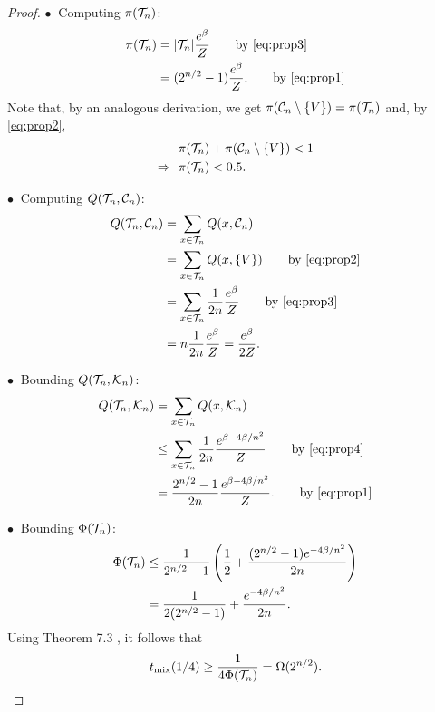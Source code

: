 \begin{proof}
\vspace{0.8em}
\noindent $\bullet\ $ Computing $\pi(\mathcal{T}_n)$:
\begin{align*}
  \pi(\htn) &= |\htn| \frac{e^{\beta}}{Z} \tag*{by \eqref{eq:prop3}} \\
         &= (2^{n/2} - 1) \frac{e^{\beta}}{Z}. \tag*{by \eqref{eq:prop1}}
\end{align*}
\noindent Note that, by an analogous derivation, we get $\pi(\mathcal{C}_n \setminus \{V\}) = \pi(\mathcal{T}_n)$ and, by \eqref{eq:prop2},
\begin{align*}
  &\pi(\mathcal{T}_n) + \pi(\mathcal{C}_n \setminus \{V\}) < 1 \\
  \Rightarrow\ \ &\pi(\mathcal{T}_n) < 0.5.
\end{align*}

\vspace{0.8em}
\noindent $\bullet\ $ Computing $Q(\mathcal{T}_n, \mathcal{C}_n)$:
\begin{align*}
  Q(\htn, \hcn) &= \sum_{x \in \htn} Q(x, \hcn) \\
                &= \sum_{x \in \htn} Q(x, \{V\}) \tag*{by \eqref{eq:prop2}} \\
                &= \sum_{x \in \htn} \frac{1}{2n} \frac{e^{\beta}}{Z} \tag*{by \eqref{eq:prop3}} \\
                &= n \frac{1}{2n} \frac{e^{\beta}}{Z} = \frac{e^{\beta}}{2Z}.
\end{align*}

\vspace{0.8em}
\noindent $\bullet\ $ Bounding $Q(\mathcal{T}_n, \mathcal{K}_n)$:
\begin{align*}
  Q(\htn, \hkn) &= \sum_{x \in \htn} Q(x, \hkn) \\
                &\leq \sum_{x \in \htn} \frac{1}{2n} \frac{e^{\beta - 4\beta/n^2}}{Z} \tag*{by \eqref{eq:prop4}} \\
                &= \frac{2^{n/2} - 1}{2n} \frac{e^{\beta - 4\beta/n^2}}{Z}. \tag*{by \eqref{eq:prop1}}
\end{align*}

\vspace{0.8em}
\noindent $\bullet\ $ Bounding $\Phi(\mathcal{T}_n)$:
\begin{align*}
  \Phi(\mathcal{T}_n) &\leq \frac{1}{2^{n/2} - 1}\left(\frac{1}{2} + \frac{(2^{n/2} - 1) e^{-4\beta/n^2}}{2n}\right)\\
          &= \frac{1}{2(2^{n/2} - 1)} + \frac{e^{-4\beta/n^2}}{2n}.
\end{align*}
Using Theorem 7.3 \citep{levin08book}, it follows that
\begin{align*}
  t_{\mathrm{mix}}(1/4) \geq \frac{1}{4\Phi(\mathcal{T}_n)} = \Omega(2^{n/2}).
\end{align*}

\end{proof}

